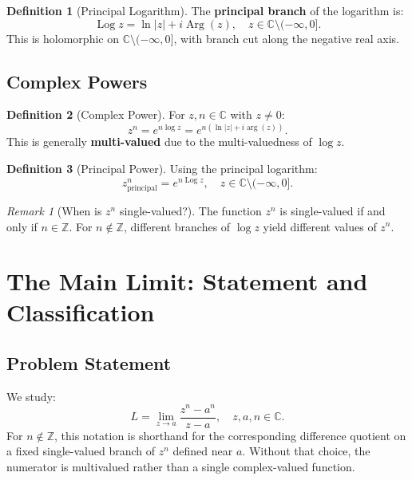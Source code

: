 \documentclass{article}
\theoremstyle{definition}
\newtheorem{definition}{Definition}[section]
\theoremstyle{remark}
\newtheorem{remark}{Remark}[section]
\newcommand{\C}{\mathbb{C}}
\newcommand{\Z}{\mathbb{Z}}
\newcommand{\Log}{\operatorname{Log}}
\newcommand{\Arg}{\operatorname{Arg}}
\begin{document}
\begin{definition}[Principal Logarithm]
The \textbf{principal branch} of the logarithm is:
\begin{equation}
\Log z = \ln|z| + i\Arg(z), \quad z \in \C \setminus (-\infty, 0].
\end{equation}
This is holomorphic on $\C \setminus (-\infty, 0]$, with branch cut along the negative real axis.
\end{definition}

\subsection{Complex Powers}

\begin{definition}[Complex Power]
For $z, n \in \C$ with $z \neq 0$:
\begin{equation}
z^n = e^{n \log z} = e^{n(\ln|z| + i\arg(z))}.
\label{eq:complex_power}
\end{equation}
This is generally \textbf{multi-valued} due to the multi-valuedness of $\log z$.
\end{definition}

\begin{definition}[Principal Power]
Using the principal logarithm:
\begin{equation}
z^n_{\text{principal}} = e^{n \Log z}, \quad z \in \C \setminus (-\infty, 0].
\end{equation}
\end{definition}

\begin{remark}[When is $z^n$ single-valued?]
The function $z^n$ is single-valued if and only if $n \in \Z$. For $n \notin \Z$, different branches of $\log z$ yield different values of $z^n$.
\end{remark}

\section{The Main Limit: Statement and Classification}

\subsection{Problem Statement}

We study:
\begin{equation}
L = \lim_{z \to a} \frac{z^n - a^n}{z - a}, \quad z, a, n \in \C.
\label{eq:main_limit}
\end{equation}
For $n \notin \Z$, this notation is shorthand for the corresponding difference
quotient on a fixed single-valued branch of $z^n$ defined near $a$. Without that
choice, the numerator is multivalued rather than a single complex-valued
function.
\end{document}
